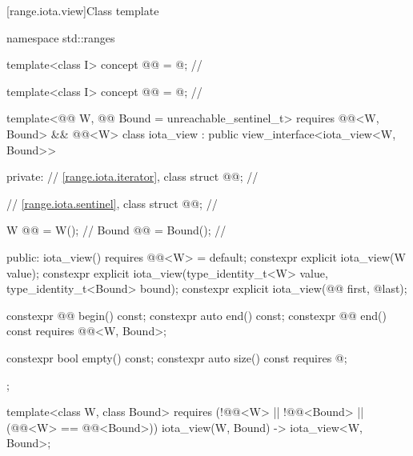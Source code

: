 [range.iota.view]{Class template }

%
\begin{codeblock}
namespace std::ranges {
  template<class I>
    concept @@ = @\seebelownc@;  // \expos

  template<class I>
    concept @@ = @\seebelownc@;    // \expos

  template<@@ W, @@ Bound = unreachable_sentinel_t>
    requires @@<W, Bound> && @@<W>
  class iota_view : public view_interface<iota_view<W, Bound>> {
  private:
    // \ref{range.iota.iterator}, class 
    struct @@;                    // \expos

    // \ref{range.iota.sentinel}, class 
    struct @@;                    // \expos

    W @@ = W();                     // \expos
    Bound @@ = Bound();             // \expos

  public:
    iota_view() requires @@<W> = default;
    constexpr explicit iota_view(W value);
    constexpr explicit iota_view(type_identity_t<W> value, type_identity_t<Bound> bound);
    constexpr explicit iota_view(@@ first, @\seebelow@ last);

    constexpr @@ begin() const;
    constexpr auto end() const;
    constexpr @@ end() const requires @@<W, Bound>;

    constexpr bool empty() const;
    constexpr auto size() const requires @\seebelow@;
  };

  template<class W, class Bound>
    requires (!@@<W> || !@@<Bound> ||
              (@@<W> == @@<Bound>))
    iota_view(W, Bound) -> iota_view<W, Bound>;
}
\end{codeblock}

